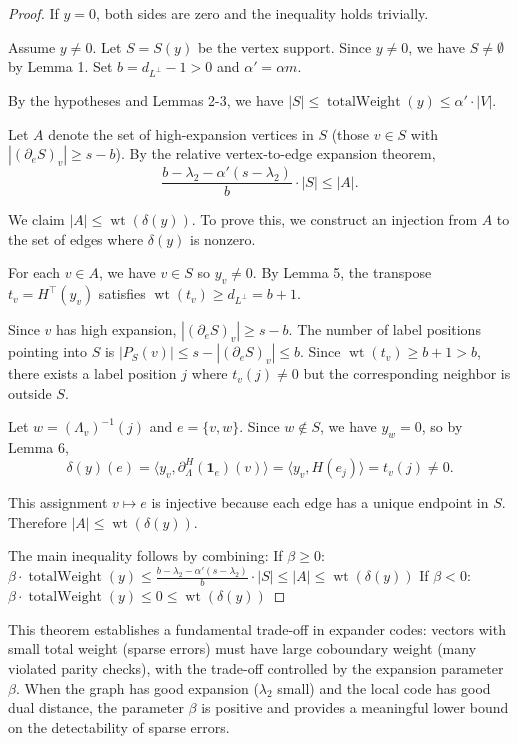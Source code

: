 \documentclass[11pt]{article}
\theoremstyle{plain}
\theoremstyle{definition}
\theoremstyle{remark}
\begin{document}
\begin{proof}
If $y = 0$, both sides are zero and the inequality holds trivially.

Assume $y \neq 0$. Let $S = S(y)$ be the vertex support. Since $y \neq 0$, we have $S \neq \emptyset$ by Lemma 1. Set $b = d_{L^\perp} - 1 > 0$ and $\alpha' = \alpha m$.

By the hypotheses and Lemmas 2-3, we have $|S| \leq \operatorname{totalWeight}(y) \leq \alpha' \cdot |V|$. 

Let $A$ denote the set of high-expansion vertices in $S$ (those $v \in S$ with $|(\partial_e S)_v| \geq s - b$). By the relative vertex-to-edge expansion theorem,
\[
\frac{b - \lambda_2 - \alpha'(s - \lambda_2)}{b} \cdot |S| \leq |A|.
\]

We claim $|A| \leq \operatorname{wt}(\delta(y))$. To prove this, we construct an injection from $A$ to the set of edges where $\delta(y)$ is nonzero.

For each $v \in A$, we have $v \in S$ so $y_v \neq 0$. By Lemma 5, the transpose $t_v = H^\top(y_v)$ satisfies $\operatorname{wt}(t_v) \geq d_{L^\perp} = b + 1$.

Since $v$ has high expansion, $|(\partial_e S)_v| \geq s - b$. The number of label positions pointing into $S$ is $|P_S(v)| \leq s - |(\partial_e S)_v| \leq b$. Since $\operatorname{wt}(t_v) \geq b + 1 > b$, there exists a label position $j$ where $t_v(j) \neq 0$ but the corresponding neighbor is outside $S$.

Let $w = (\Lambda_v)^{-1}(j)$ and $e = \{v,w\}$. Since $w \notin S$, we have $y_w = 0$, so by Lemma 6,
\[
\delta(y)(e) = \langle y_v, \partial_\Lambda^H(\mathbf{1}_e)(v) \rangle = \langle y_v, H(e_j) \rangle = t_v(j) \neq 0.
\]

This assignment $v \mapsto e$ is injective because each edge has a unique endpoint in $S$. Therefore $|A| \leq \operatorname{wt}(\delta(y))$.

The main inequality follows by combining:
If $\beta \geq 0$: $\beta \cdot \operatorname{totalWeight}(y) \leq \frac{b - \lambda_2 - \alpha'(s - \lambda_2)}{b} \cdot |S| \leq |A| \leq \operatorname{wt}(\delta(y))$
If $\beta < 0$: $\beta \cdot \operatorname{totalWeight}(y) \leq 0 \leq \operatorname{wt}(\delta(y))$
\end{proof}

This theorem establishes a fundamental trade-off in expander codes: vectors with small total weight (sparse errors) must have large coboundary weight (many violated parity checks), with the trade-off controlled by the expansion parameter $\beta$. When the graph has good expansion ($\lambda_2$ small) and the local code has good dual distance, the parameter $\beta$ is positive and provides a meaningful lower bound on the detectability of sparse errors.
\end{document}
